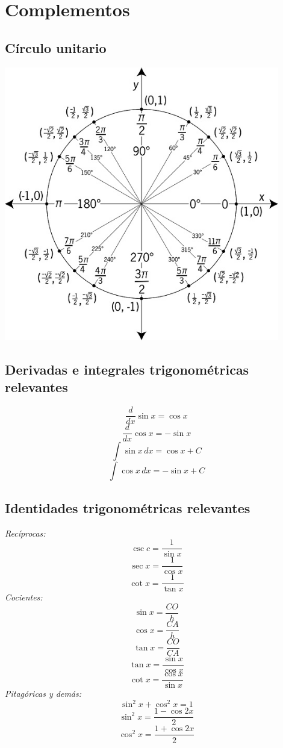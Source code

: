 \documentclass[letterpaper, 12pt]{article}
\begin{document}
        \section{Complementos}
        \subsection{Círculo unitario}
        \begin{center}
            \includegraphics[width=12cm]{circulo.jpg}
        \end{center}
        \subsection{Derivadas e integrales trigonométricas relevantes}
        \[\frac{d}{dx}\sin x=\cos x\]
        \[\frac{d}{dx}\cos x=-\sin x\]
        \[\int \sin x\, dx=\cos x + C\]
        \[\int \cos x\, dx=-\sin x + C\]
        \subsection{Identidades trigonométricas relevantes}
        \emph{Recíprocas:}
        \[\csc c=\frac{1}{\sin x}\]
        \[\sec x=\frac{1}{\cos x}\]
        \[\cot x=\frac{1}{\tan x}\]
        \emph{Cocientes:}
        \[\sin x=\frac{CO}{h}\]
        \[\cos x=\frac{C\!A}{h}\]
        \[\tan x=\frac{CO}{C\!A}\]
        \[\tan x=\frac{\sin x}{\cos x}\]
        \[\cot x=\frac{\cos x}{\sin x}\]
        \emph{Pitagóricas y demás:}
        \[\sin^2x+\cos^2x=1\]
        \[\sin^2x=\frac{1-\cos2x}{2}\]
        \[\cos^2x=\frac{1+\cos2x}{2}\]
        
\end{document}
